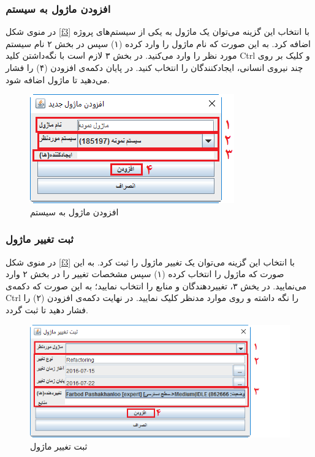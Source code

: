 \subsubsection{افزودن ماژول به سیستم}
در منوی شکل
\ref{f3}
با انتخاب این گزینه می‌توان یک  ماژول به یکی از سیستم‌های پروژه اضافه کرد. به این صورت که نام ماژول را وارد کرده (۱)  سپس در بخش ۲ نام سیستم مورد نظر را وارد می‌کنید. در بخش ۳ لازم است با نگه‌داشتن کلید Ctrl و کلیک بر روی چند نیروی انسانی، ایجادکنندگان را انتخاب کنید. در پایان دکمه‌ی افزودن  (۴) را فشار می‌دهید تا ماژول اضافه شود.
\begin{figure}[H]
	\centering
	\includegraphics[scale=0.8]{img/manual/addMod}
	\caption{افزودن ماژول به سیستم}
\end{figure}

\subsubsection{ثبت تغییر ماژول}
در منوی شکل
\ref{f3}
با انتخاب این گزینه می‌توان یک تغییر ماژول را ثبت کرد. به این صورت که ماژول را انتخاب کرده (۱)  سپس مشخصات تغییر را در بخش ۲ وارد می‌نمایید. در یخش ۳، تغییردهندگان و منابع را انتخاب نمایید؛ به این صورت که دکمه‌ی Ctrl را نگه داشته و روی موارد مدنظر کلیک نمایید. در نهایت دکمه‌ی افزودن  (۲)  را فشار دهید تا ثبت گردد.
\begin{figure}[H]
	\centering
	\includegraphics[scale=0.8]{img/manual/submitMM}
	\caption{ثبت تغییر ماژول}
\end{figure}

